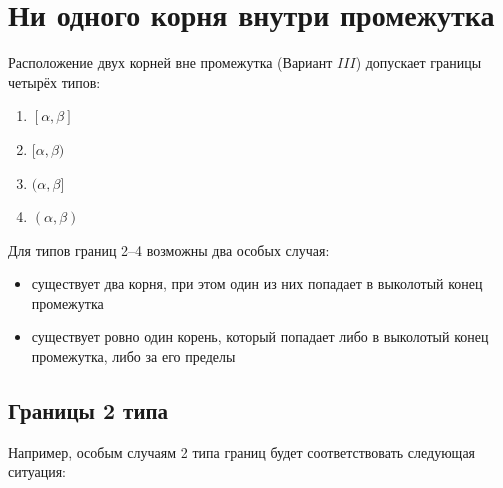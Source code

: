 \section {Ни одного корня внутри промежутка}

Расположение двух корней вне промежутка (Вариант $III$) допускает границы четырёх типов:

\begin {enumerate} [labelindent=\parindent, leftmargin=*]
    \item {$[\alpha, \beta]$}
    \item {$[\alpha, \beta)$}
    \item {$(\alpha, \beta]$}
    \item {$(\alpha, \beta)$}
\end {enumerate}

Для типов границ 2--4 возможны два особых случая:

\begin {itemize}
    \item {существует два корня, при этом один из них попадает в выколотый конец промежутка}
    \item {существует ровно один корень, который попадает либо в выколотый конец промежутка, либо
     за его пределы }
\end {itemize}

\subsection {Границы 2 типа}

Например, особым случаям 2 типа границ будет соответствовать следующая ситуация:

